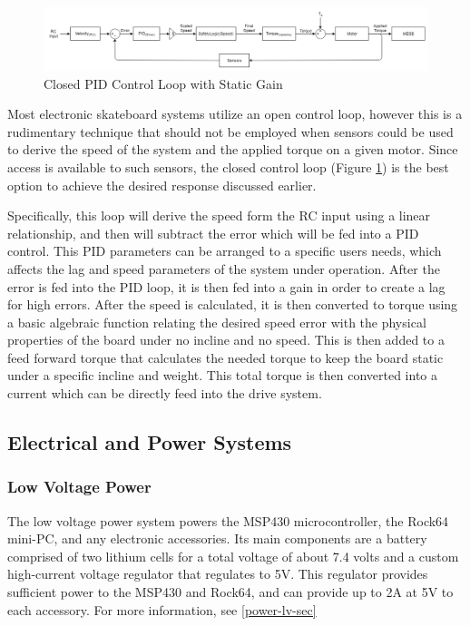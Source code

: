 \documentclass[titlepage, letterpaper,12pt]{article}
\begin{document}
\begin{figure}[!htbp]\centering
\includegraphics[width=\textwidth,height=\textheight,keepaspectratio]{ControlFigs/ClosedLoop.png}
\caption{Closed PID Control Loop with Static Gain}
\label{ClosedPP}
\end{figure}

Most electronic skateboard systems utilize an open control loop, however this is a rudimentary technique that should not be employed when sensors could be used to derive the speed of the system and the applied torque on a given motor. Since access is available to such sensors, the closed control loop (Figure \ref{ClosedPP}) is the best option to achieve the desired response discussed earlier.

Specifically, this loop will derive the speed form the RC input using a linear relationship, and then will subtract the error which will be fed into a PID control. This PID parameters can be arranged to a specific users needs, which affects the lag and speed parameters of the system under operation. After the error is fed into the PID loop, it is then fed into a gain in order to create a lag for high errors. After the speed is calculated, it is then converted to torque using a basic algebraic function relating the desired speed error with the physical properties of the board under no incline and no speed. This is then added to a feed forward torque that calculates the needed torque to keep the board static under a specific incline and weight. This total torque is then converted into a current which can be directly feed into the drive system.

\subsection{Electrical and Power Systems}
\subsubsection{Low Voltage Power}
The low voltage power system powers the MSP430 microcontroller, the Rock64 mini-PC, and any electronic accessories. Its main components are a battery comprised of two lithium cells for a total voltage of about 7.4 volts and a custom high-current voltage regulator that regulates to 5V. This regulator provides sufficient power to the MSP430 and Rock64, and can provide up to 2A at 5V to each accessory. For more information, see \ref{power-lv-sec}
\end{document}
